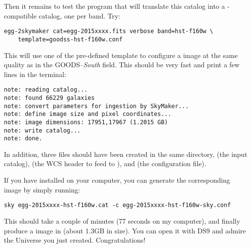 Then it remains to test the program that will translate this catalog into a \skymaker-compatible catalog, one per band. Try:
\begin{verbatim}
egg-2skymaker cat=egg-2015xxxx.fits verbose band=hst-f160w \
    template=goodss-hst-f160w.conf
\end{verbatim}
This will use one of the pre-defined \skymaker template to configure a \hubble image at the same quality as in the GOODS--{\it South} field. This should be very fast and print a few lines in the terminal:
\begin{verbatim}
note: reading catalog...
note: found 66229 galaxies
note: convert parameters for ingestion by SkyMaker...
note: define image size and pixel coordinates...
note: image dimensions: 17951,17967 (1.2015 GB)
note: write catalog...
note: done.
\end{verbatim}
In addition, three files should have been created in the same directory,  (the \skymaker input catalog),  (the WCS header to feed to \skymaker), and  (the \skymaker configuration file).

If you have \skymaker installed on your computer, you can generate the corresponding image by simply running:
\begin{verbatim}
sky egg-2015xxxx-hst-f160w.cat -c egg-2015xxxx-hst-f160w-sky.conf
\end{verbatim}

This should take a couple of minutes (77 seconds on my computer), and finally produce a \hubble image in  (about 1.3GB in size). You can open it with DS9 and admire the Universe you just created. Congratulations!
